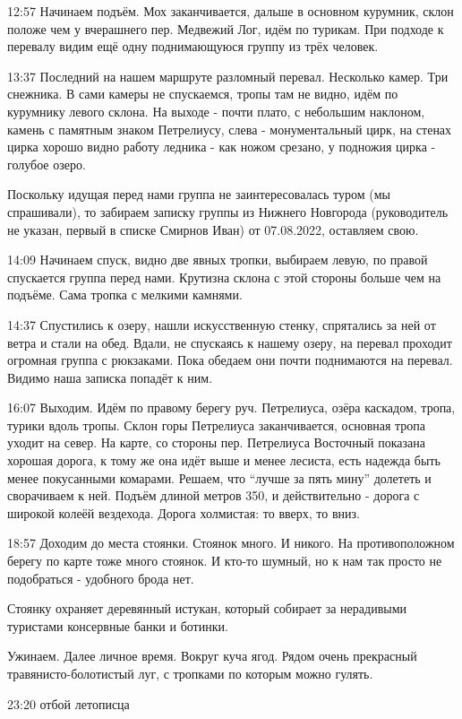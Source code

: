 12:57 Начинаем подъём. Мох заканчивается, дальше в основном курумник, склон положе чем у вчерашнего пер. Медвежий Лог,
идём по турикам. При подходе к перевалу видим ещё одну поднимающуюся группу из трёх человек.

13:37 Последний на нашем маршруте разломный перевал. Несколько камер. Три снежника. В сами камеры не спускаемся,
тропы там не видно, идём по курумнику левого склона. На выходе - почти плато, с небольшим наклоном,
камень с памятным знаком Петрелиусу, слева - монументальный цирк, на стенах цирка хорошо видно
работу ледника - как ножом срезано, у подножия цирка - голубое озеро.

Поскольку идущая перед нами группа не заинтересовалась туром (мы спрашивали), то забираем записку группы из
Нижнего Новгорода (руководитель не указан, первый в списке Смирнов Иван) от 07.08.2022, оставляем свою.

14:09 Начинаем спуск, видно две явных тропки, выбираем левую, по правой спускается группа перед нами.
Крутизна склона с этой стороны больше чем на подъёме. Сама тропка с мелкими камнями.

14:37 Спустились к озеру, нашли искусственную стенку, спрятались за ней от ветра и стали на обед.
Вдали, не спускаясь к нашему озеру, на перевал проходит огромная группа с рюкзаками.
Пока обедаем они почти поднимаются на перевал. Видимо наша записка попадёт к ним.

16:07 Выходим.
Идём по правому берегу руч. Петрелиуса, озёра каскадом, тропа, турики вдоль тропы.
Склон горы Петрелиуса заканчивается, основная тропа уходит на север. На карте, со стороны пер. Петрелиуса Восточный
показана хорошая дорога, к тому же она идёт выше и менее лесиста, есть надежда быть менее покусанными комарами.
Решаем, что ``лучше за пять мину'' долететь и сворачиваем к ней.
Подъём длиной метров 350, и действительно - дорога с широкой колеёй вездехода. Дорога холмистая: то вверх, то вниз.

18:57 Доходим до места стоянки. Стоянок много. И никого.
На противоположном берегу по карте тоже много стоянок. И кто-то шумный, но к нам так просто не подобраться - удобного брода нет.

Стоянку охраняет деревянный истукан, который собирает за нерадивыми туристами консервные банки и ботинки.

Ужинаем. Далее личное время.
Вокруг куча ягод. Рядом очень прекрасный травянисто-болотистый луг, с тропками по которым можно гулять.

23:20 отбой летописца

